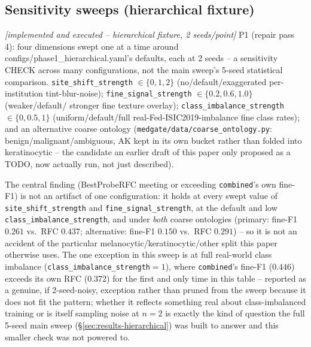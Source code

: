 \documentclass[11pt]{article}
\newcommand{\status}[1]{\textit{[#1]}}
\begin{document}
\subsection{Sensitivity sweeps (hierarchical fixture)}
\label{sec:hierarchical-sensitivity}
\status{implemented and executed -- hierarchical fixture, 2 seeds/point}
P1 (repair pass 4): four dimensions swept one at a time around
configs/phase1\_hierarchical.yaml's defaults, each at 2 seeds -- a
sensitivity CHECK across many configurations, not the main sweep's 5-seed
statistical comparison. \texttt{site\_shift\_strength} $\in\{0,1,2\}$
(no/default/exaggerated per-institution tint-blur-noise);
\texttt{fine\_signal\_strength} $\in\{0.2,0.6,1.0\}$ (weaker/default/
stronger fine texture overlay); \texttt{class\_imbalance\_strength}
$\in\{0,0.5,1\}$ (uniform/default/full real-Fed-ISIC2019-imbalance fine
class rates); and an alternative coarse ontology
(\texttt{medgate/data/coarse\_ontology.py}: benign/malignant/ambiguous,
AK kept in its own bucket rather than folded into keratinocytic -- the
candidate an earlier draft of this paper only proposed as a TODO, now
actually run, not just described).

\label{tab:phase1-hierarchical-sensitivity}
The central finding (BestProbeRFC meeting or exceeding
\texttt{combined}'s own fine-F1) is not an artifact of one configuration:
it holds at every swept value of \texttt{site\_shift\_strength} and
\texttt{fine\_signal\_strength}, at the default and low
\texttt{class\_imbalance\_strength}, and under \emph{both} coarse
ontologies (primary: fine-F1 $0.261$ vs.\ RFC $0.437$; alternative:
fine-F1 $0.150$ vs.\ RFC $0.291$) -- so it is not an accident of the
particular melanocytic/keratinocytic/other split this paper otherwise
uses. The one exception in this sweep is at full real-world class
imbalance (\texttt{class\_imbalance\_strength}$=1$), where
\texttt{combined}'s fine-F1 ($0.446$) exceeds its own RFC ($0.372$) for
the first and only time in this table -- reported as a genuine, if
2-seed-noisy, exception rather than pruned from the sweep because it
does not fit the pattern; whether it reflects something real about
class-imbalanced training or is itself sampling noise at $n=2$ is exactly
the kind of question the full 5-seed main sweep (\S\ref{sec:results-hierarchical})
was built to answer and this smaller check was not powered to.
\end{document}
